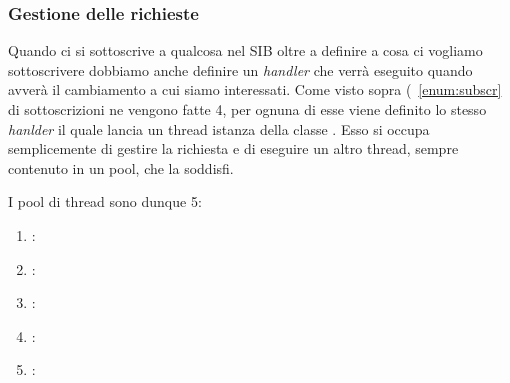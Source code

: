 \subsubsection{Gestione delle richieste}

Quando ci si sottoscrive a qualcosa nel SIB oltre a definire a cosa ci vogliamo sottoscrivere dobbiamo anche definire un \emph{handler} che verrà eseguito quando avverà il cambiamento a cui siamo interessati. Come visto sopra (~\ref{enum:subscr} di sottoscrizioni ne vengono fatte 4, per ognuna di esse viene definito lo stesso \emph{hanlder} il quale lancia un thread istanza della classe . Esso si occupa semplicemente di gestire la richiesta e di eseguire un altro thread, sempre contenuto in un pool, che la soddisfi.

I pool di thread sono dunque 5:

\begin{enumerate}
	\item {}:
	\item {}:
	\item {}:
	\item {}:
	\item {}:
\end{enumerate}







